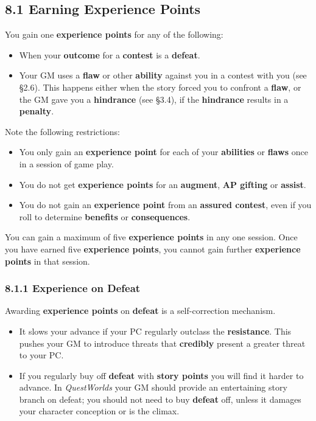 \documentclass[
  11pt,
]{article}
\providecommand{\tightlist}{%
  \setlength{\itemsep}{0pt}\setlength{\parskip}{0pt}}
\begin{document}
\hypertarget{earning-experience-points}{%
\subsection{8.1 Earning Experience
Points}\label{earning-experience-points}}

You gain one \textbf{experience points} for any of the following:

\begin{itemize}
\tightlist
\item
  When your \textbf{outcome} for a \textbf{contest} is a
  \textbf{defeat}.
\item
  Your GM uses a \textbf{flaw} or other \textbf{ability} against you in
  a contest with you (see §2.6). This happens either when the story
  forced you to confront a \textbf{flaw}, or the GM gave you a
  \textbf{hindrance} (see §3.4), if the \textbf{hindrance} results in a
  \textbf{penalty}.
\end{itemize}

Note the following restrictions:

\begin{itemize}
\tightlist
\item
  You only gain an \textbf{experience point} for each of your
  \textbf{abilities} or \textbf{flaws} once in a session of game play.
\item
  You do not get \textbf{experience points} for an \textbf{augment},
  \textbf{AP gifting} or \textbf{assist}.
\item
  You do not gain an \textbf{experience point} from an \textbf{assured
  contest}, even if you roll to determine \textbf{benefits} or
  \textbf{consequences}.
\end{itemize}

You can gain a maximum of five \textbf{experience points} in any one
session. Once you have earned five \textbf{experience points}, you
cannot gain further \textbf{experience points} in that session.

\hypertarget{experience-on-defeat}{%
\subsubsection{8.1.1 Experience on Defeat}\label{experience-on-defeat}}

Awarding \textbf{experience points} on \textbf{defeat} is a
self-correction mechanism.

\begin{itemize}
\tightlist
\item
  It slows your advance if your PC regularly outclass the
  \textbf{resistance}. This pushes your GM to introduce threats that
  \textbf{credibly} present a greater threat to your PC.
\item
  If you regularly buy off \textbf{defeat} with \textbf{story points}
  you will find it harder to advance. In \emph{QuestWorlds} your GM
  should provide an entertaining story branch on defeat; you should not
  need to buy \textbf{defeat} off, unless it damages your character
  conception or is the climax.
\end{itemize}
\end{document}
